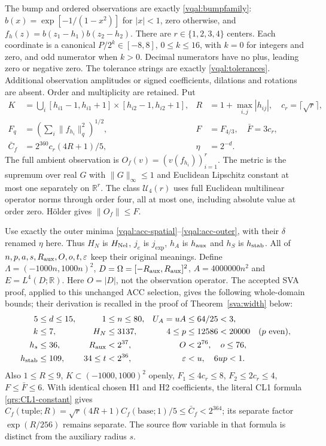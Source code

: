 \documentclass[11pt]{article}
\theoremstyle{plain}
\theoremstyle{definition}
\theoremstyle{remark}
\newcommand{\R}{\mathbb{R}}
\begin{document}
The bump and ordered observations are exactly
\eqref{vqal:bumpfamily}: $b(x)=\exp[-1/(1-x^2)]$ for $|x|<1$, zero
otherwise, and $f_h(z)=b(z_1-h_1)b(z_2-h_2)$. There are $r\in\{1,2,3,4\}$
centers. Each coordinate is a canonical $P/2^k\in[-8,8]$,
$0\le k\le16$, with $k=0$ for integers and zero, and odd numerator
when $k>0$. Decimal numerators have no plus, leading zero or negative
zero. The tolerance strings are exactly \eqref{vqal:tolerances}.
Additional observation amplitudes or signed coefficients, dilations and
rotations are absent. Order and multiplicity are retained. Put
\begin{align}\label{sva:geometry}
 K&=\bigcup_i[h_{i1}-1,h_{i1}+1]\times[h_{i2}-1,h_{i2}+1],
 &R&=1+\max_{i,j}|h_{ij}|,\quad c_r=\lceil\sqrt r\rceil,\nonumber\\
 F_q&=\left(\sum_i\|f_{h_i}\|_q^2\right)^{1/2},
 &F&=F_{4/3},\quad\bar F=3c_r,\nonumber\\
 \bar C_f&=2^{360}c_r(4R+1)/5,
 &\eta&=2^{-d}.
\end{align}
The full ambient observation is $O_f(v)=(v(f_{h_i}))_{i=1}^r$.
The metric is the supremum over real $G$ with $\|G\|_\infty\le1$
and Euclidean Lipschitz constant at most one separately on $\R^r$.
The class $\mathcal U_4(r)$ uses full Euclidean multilinear operator
norms through order four, all at most one, including absolute value at
order zero. H\"older gives $\|O_f\|\le F$.

Use exactly the outer minima \eqref{vqal:acc-spatial}--\eqref{vqal:acc-outer},
with their $\delta$ renamed $\eta$ here. Thus $H_N$ is $H_{\rm Nel}$,
$j_e$ is $j_{\exp}$, $h_A$ is $h_{\rm aux}$ and $h_S$ is
$h_{\rm stab}$. All of $n,p,a,s,R_{\rm aux},O,o,t,\varepsilon$ keep
their original meanings. Define
$\Lambda=(-1000n,1000n)^2$, $D=\Omega=[-R_{\rm aux},R_{\rm aux}]^2$,
$A=4000000n^2$ and $E=L^4(D;\R)$. Here $O=|D|$, not the observation
operator. The accepted SVA proof, applied to this unchanged ACC selection,
gives the following whole-domain bounds; their derivation is recalled
in the proof of Theorem~\ref{sva:width} below:
\begin{align}\label{sva:stagebounds}
 5&\le d\le15,&1&\le n\le80,& U_A=uA&\le64/25<3,\nonumber\\
 k&\le7,&H_N&\le3137,&4\le p&\le12586<20000\quad(p\text{ even}),\nonumber\\
 h_s&\le36,&R_{\rm aux}&<2^{37},& O&<2^{76},\quad o\le76,\nonumber\\
 h_{\rm stab}&\le109,&34\le t&<2^{36},&\varepsilon&<u,\quad6up<1.
\end{align}
Also $1\le R\le9$, $K\subset(-1000,1000)^2$ openly,
$F_1\le4c_r\le8$, $F_2\le2c_r\le4$, $F\le\bar F\le6$.
With identical chosen H1 and H2 coefficients, the literal CL1 formula
\eqref{qrs:CL1-constant} gives
$C_f(\text{tuple};R)=\sqrt r(4R+1)C_f(\text{base};1)/5\le\bar C_f<2^{364}$;
its separate factor $\exp(R/256)$ remains separate. The source flow
variable in that formula is distinct from the auxiliary radius $s$.
\end{document}
